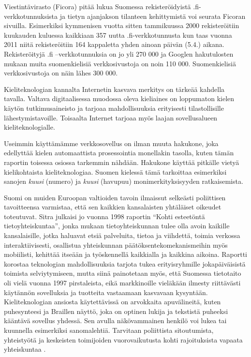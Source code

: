 \documentclass{../../metanetpaper}
\begin{document}
\begin{Parallel}[c]{79mm}{78mm}
{Viestintävirasto (Ficora) pitää lukua Suomessa rekisteröidyistä
.fi-verkkotunnuksista ja tietyn ajanjakson tilanteen kehittymistä voi
seurata Ficoran sivuilla. Esimerkiksi kymmenisen vuotta sitten
tammikuussa 2000 rekisteröitiin kuukauden kuluessa kaikkiaan 357 uutta
.fi-verkkotunnusta kun taas vuonna 2011 niitä rekisteröitiin 164
kappaletta yhden ainoan päivän (5.4.)  aikana. Rekisteröityjä .fi
–verkkotunnuksia on jo yli 270 000 ja Googlen hakutulosten mukaan
muita suomenkielisiä verkkosivustoja on noin 110 000.  Suomenkielisiä
verkkosivustoja on näin lähes 300 000.

Kieliteknologian kannalta Internetin kasvava merkitys on tärkeää
kahdella tavalla. Valtava digitaalisessa muodossa oleva kieliaines
on loppumaton kielen käytön tutkimusaineisto ja tarjoaa mahdollisuuksia erityisesti 
tilastollisille  lähestymistavoille. Toisaalta Internet tarjoaa myös 
laajan sovellusalueen kieliteknologialle.

Useimmin käyttämämme verkkosovellus on ilman muuta hakukone, joka
edellyttää kielen automaattista prosessointia monellakin tasolla,
kuten tämän raportin toisessa osiossa tarkemmin nähdään. Hakukone käyttää
pitkälle vietyä kielikohtaista kieliteknologiaa. Suomen kielessä tämä tarkoittaa 
esimerkiksi  sanojen \textit{kuusi} (numero)
ja \textit{kuusi} (havupuu) monimerkityksisyyden ratkaisemista.

Suomi on muiden Euroopan valtioiden tavoin ilmaissut selkeästi
poliittisen tavoitteensa varmistaa, että sen kaikkien kansalaisten yhtäläiset
oikeudet toteutuvat. Sitra julkaisi jo vuonna 1998 raportin “Kohti
esteetöntä tietoyhteiskuntaa”, jonka mukaan tietoyhteiskunnan
tulee olla avoin kaikille kansalaisille, jotka haluavat 
etsiä palveluita, tietoa ja viihdettä, toimia verkossa
interaktiivisesti, osallistua yhteiskunnan päätöksentekomekanismeihin
myös mobiilisti, kehittää itseään ja työskennellä kaikkialla ja
kaikkina aikoina. Raportti korostaa teknologian mahdollisuuksia
tarjota tukea erityisryhmille jokapäiväisistä toimista selviytymiseen,
mutta siinä painotetaan myös, että Suomessa tietotaito oli vielä
vuonna 1997 pirstaleista, eikä markkinoille vieläkään ilmesty riittävästi käytännön
sovelluksia ja tuotteita vastaamaan kasvavaan kysyntään. Kieliteknologian ansiosta
käytettävissä on arvokkaita apuvälineitä, kuten puhesynteesi ja Braillen
näyttö, joka on optinen lukija ja tekstistä puheeksi kääntävä sovellus yhdessä. 
Sen avulla näkövammainen henkilö voi lukea tai kuunnella esimerkiksi sanomalehtiä. 
Tarvitaan poliittista sitoutumista, yhteistyötä ja keskeisten toimijoiden 
vuorovaikutusta  kohti rajoituksista vapaata yhteiskuntaa \cite{Sitra1998}.

}
\end{Parallel}
\end{document}
